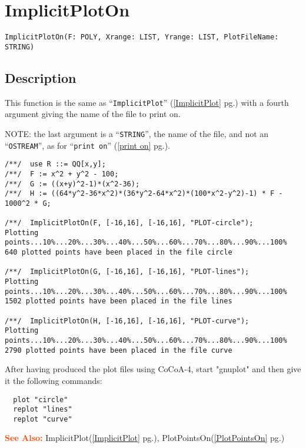 \documentclass[a4paper]{mybook}
\newenvironment{command}{}{} %
\newcommand\SeeAlso{\par\textcolor{OrangeRed}{\textbf{\large See Also: }}}
\begin{document}
\section{ImplicitPlotOn}
\label{ImplicitPlotOn}
\begin{command} %


\begin{Verbatim}[label=syntax, rulecolor=\color{MidnightBlue},
frame=single]
ImplicitPlotOn(F: POLY, Xrange: LIST, Yrange: LIST, PlotFileName: STRING)
\end{Verbatim}


\subsection*{Description}

This function is the same as ``\verb&ImplicitPlot&'' (\ref{ImplicitPlot} pg.\pageref{ImplicitPlot}) with a fourth
argument giving the name of the file to print on.
\par 
NOTE: the last argument is a ``\verb&STRING&'', the name of the file, and not
an ``\verb&OSTREAM&'', as for ``\verb&print on&'' (\ref{print on} pg.\pageref{print on}).
\begin{Verbatim}[label=example, rulecolor=\color{PineGreen}, frame=single]
/**/  use R ::= QQ[x,y];
/**/  F := x^2 + y^2 - 100;
/**/  G := ((x+y)^2-1)*(x^2-36);
/**/  H := ((64*y^2-36*x^2)*(36*y^2-64*x^2)*(100*x^2-y^2)-1) * F - 1000^2 * G;

/**/  ImplicitPlotOn(F, [-16,16], [-16,16], "PLOT-circle");
Plotting points...10%...20%...30%...40%...50%...60%...70%...80%...90%...100%
640 plotted points have been placed in the file circle

/**/  ImplicitPlotOn(G, [-16,16], [-16,16], "PLOT-lines");
Plotting points...10%...20%...30%...40%...50%...60%...70%...80%...90%...100%
1502 plotted points have been placed in the file lines

/**/  ImplicitPlotOn(H, [-16,16], [-16,16], "PLOT-curve");
Plotting points...10%...20%...30%...40%...50%...60%...70%...80%...90%...100%
2790 plotted points have been placed in the file curve
\end{Verbatim}

After having produced the plot files using CoCoA-4,
start "gnuplot" and then give it the following commands:
\begin{verbatim}  plot "circle"
  replot "lines"
  replot "curve"
\end{verbatim}

\SeeAlso %
  ImplicitPlot(\ref{ImplicitPlot} pg.\pageref{ImplicitPlot}), 
    PlotPointsOn(\ref{PlotPointsOn} pg.\pageref{PlotPointsOn})
\end{command} %
\end{document}
